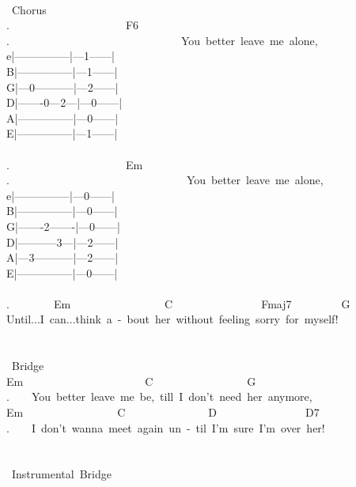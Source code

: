 {\\
\lbrack\ Chorus\rbrack\\
.\ \ \ \ \ \ \ \ \ \ \ \ \ \ \ \ \ \ \ \ \ F6\\
.\ \ \ \ \ \ \ \ \ \ \ \ \ \ \ \ \ \ \ \ \ \ \ \ \ \ \ \ \ \ \ You\ better\ leave\ me\ alone,\\
e|---------------|---1------|\\
B|---------------|---1------|\\
G|---0-----------|---2------|\\
D|-------0---2---|---0------|\\
A|---------------|---0------|\\
E|---------------|---1------|\\
\\
.\ \ \ \ \ \ \ \ \ \ \ \ \ \ \ \ \ \ \ \ \ Em\\
.\ \ \ \ \ \ \ \ \ \ \ \ \ \ \ \ \ \ \ \ \ \ \ \ \ \ \ \ \ \ \ \ You\ better\ leave\ me\ alone,\\
e|---------------|---0------|\\
B|---------------|---0------|\\
G|-------2-------|---0------|\\
D|-----------3---|---2------|\\
A|---3-----------|---2------|\\
E|---------------|---0------|\\
\\
.\ \ \ \ \ \ \ \ Em\ \ \ \ \ \ \ \ \ \ \ \ \ \ \ \ \ C\ \ \ \ \ \ \ \ \ \ \ \ \ \ \ \ Fmaj7\ \ \ \ \ \ \ \ \ G\\
Until...I\ can...think\ a\ -\ bout\ her\ without\ feeling\ sorry\ for\ myself!\\
\\
\\
\lbrack\ Bridge\rbrack\\
Em\ \ \ \ \ \ \ \ \ \ \ \ \ \ \ \ \ \ \ \ \ \ C\ \ \ \ \ \ \ \ \ \ \ \ \ \ \ \ \ G\\
.\ \ \ \ You\ better\ leave\ me\ be,\ till\ I\ don't\ need\ her\ anymore,\\
Em\ \ \ \ \ \ \ \ \ \ \ \ \ \ \ \ \ C\ \ \ \ \ \ \ \ \ \ \ \ \ \ \ D\ \ \ \ \ \ \ \ \ \ \ \ \ \ \ \ D7\\
.\ \ \ \ I\ don't\ wanna\ meet\ again\ un\ -\ til\ I'm\ sure\ I'm\ over\ her!\\
\\
\\
\lbrack\ Instrumental\ Bridge\rbrack\\
}
